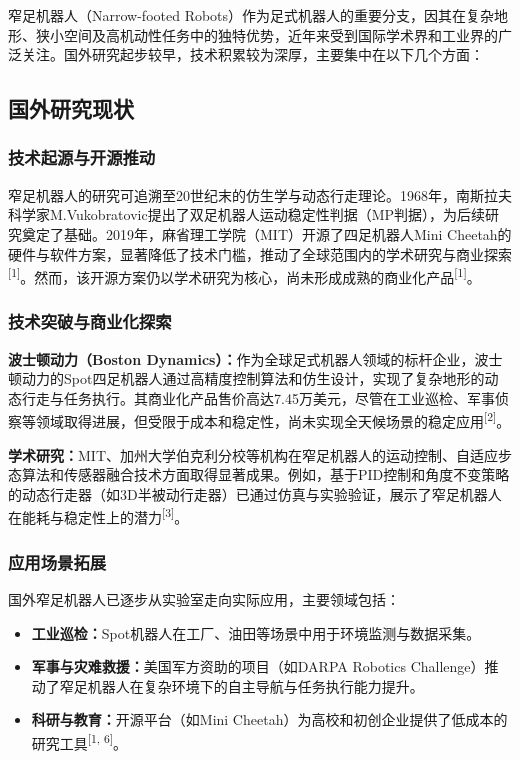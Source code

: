 \documentclass[a4paper,fontset=windows]{ctexart}
\providecommand{\tightlist}{%
  \setlength{\itemsep}{0pt}\setlength{\parskip}{0pt}}
\begin{document}
窄足机器人（Narrow-footed Robots）作为足式机器人的重要分支，因其在复杂地形、狭小空间及高机动性任务中的独特优势，近年来受到国际学术界和工业界的广泛关注。国外研究起步较早，技术积累较为深厚，主要集中在以下几个方面：

\subsection{国外研究现状}
\subsubsection{技术起源与开源推动}
窄足机器人的研究可追溯至20世纪末的仿生学与动态行走理论。1968年，南斯拉夫科学家M.Vukobratovic提出了双足机器人运动稳定性判据（MP判据），为后续研究奠定了基础。2019年，麻省理工学院（MIT）开源了四足机器人Mini Cheetah的硬件与软件方案，显著降低了技术门槛，推动了全球范围内的学术研究与商业探索\textsuperscript{[1]}。然而，该开源方案仍以学术研究为核心，尚未形成成熟的商业化产品\textsuperscript{[1]}。

\subsubsection{技术突破与商业化探索}
\textbf{波士顿动力（Boston Dynamics）：}作为全球足式机器人领域的标杆企业，波士顿动力的Spot四足机器人通过高精度控制算法和仿生设计，实现了复杂地形的动态行走与任务执行。其商业化产品售价高达7.45万美元，尽管在工业巡检、军事侦察等领域取得进展，但受限于成本和稳定性，尚未实现全天候场景的稳定应用\textsuperscript{[2]}。

\textbf{学术研究：}MIT、加州大学伯克利分校等机构在窄足机器人的运动控制、自适应步态算法和传感器融合技术方面取得显著成果。例如，基于PID控制和角度不变策略的动态行走器（如3D半被动行走器）已通过仿真与实验验证，展示了窄足机器人在能耗与稳定性上的潜力\textsuperscript{[3]}。

\subsubsection{应用场景拓展}
国外窄足机器人已逐步从实验室走向实际应用，主要领域包括：

\begin{itemize}
    \tightlist
    \item \textbf{工业巡检：}Spot机器人在工厂、油田等场景中用于环境监测与数据采集。
    \item \textbf{军事与灾难救援：}美国军方资助的项目（如DARPA Robotics Challenge）推动了窄足机器人在复杂环境下的自主导航与任务执行能力提升。
    \item \textbf{科研与教育：}开源平台（如Mini Cheetah）为高校和初创企业提供了低成本的研究工具\textsuperscript{[1, 6]}。
\end{itemize}
\end{document}

